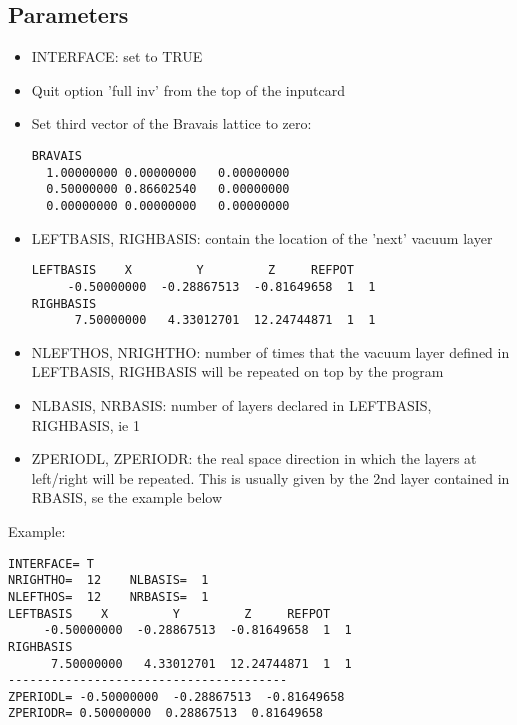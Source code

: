\documentclass[11pt,fleqn]{book} %
\begin{document}
\subsection{Parameters}

\begin{itemize}

\item INTERFACE: set to TRUE

\item Quit option 'full inv' from the top of the inputcard

\item Set third vector of the Bravais lattice to zero:

\begin{VBox}
\begin{verbatim}
BRAVAIS
  1.00000000 0.00000000   0.00000000
  0.50000000 0.86602540   0.00000000
  0.00000000 0.00000000   0.00000000
\end{verbatim}
\end{VBox}

\item LEFTBASIS, RIGHBASIS: contain the location of the 'next' vacuum layer
\begin{VBox}
\begin{verbatim}
LEFTBASIS    X         Y         Z     REFPOT
     -0.50000000  -0.28867513  -0.81649658  1  1
RIGHBASIS
      7.50000000   4.33012701  12.24744871  1  1
\end{verbatim}
\end{VBox}

\item NLEFTHOS, NRIGHTHO: number of times that the vacuum layer defined in
LEFTBASIS, RIGHBASIS will be repeated on top by the program

\item NLBASIS, NRBASIS: number of layers declared in LEFTBASIS, RIGHBASIS, ie 1

\item ZPERIODL, ZPERIODR: the real space direction in which the layers at
left/right will be repeated. This is usually given by the 2nd layer contained in RBASIS,
se the example below
\end{itemize}
Example:
\begin{VBox}
\begin{verbatim}
INTERFACE= T
NRIGHTHO=  12    NLBASIS=  1
NLEFTHOS=  12    NRBASIS=  1
LEFTBASIS    X         Y         Z     REFPOT
     -0.50000000  -0.28867513  -0.81649658  1  1
RIGHBASIS
      7.50000000   4.33012701  12.24744871  1  1
---------------------------------------
ZPERIODL= -0.50000000  -0.28867513  -0.81649658
ZPERIODR= 0.50000000  0.28867513  0.81649658
\end{verbatim}
\end{VBox}
\end{document}
